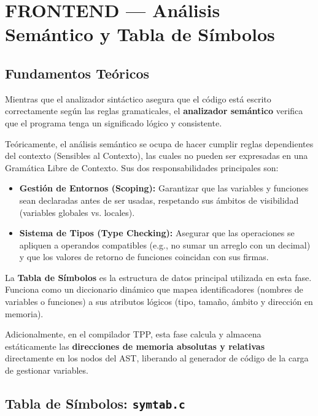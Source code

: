 \chapter{FRONTEND — Análisis Semántico y Tabla de Símbolos}

\section{Fundamentos Teóricos}

Mientras que el analizador sintáctico asegura que el código está escrito correctamente según las reglas gramaticales, el \textbf{analizador semántico} verifica que el programa tenga un significado lógico y consistente. 

Teóricamente, el análisis semántico se ocupa de hacer cumplir reglas dependientes del contexto (Sensibles al Contexto), las cuales no pueden ser expresadas en una Gramática Libre de Contexto. Sus dos responsabilidades principales son:
\begin{itemize}
    \item \textbf{Gestión de Entornos (Scoping):} Garantizar que las variables y funciones sean declaradas antes de ser usadas, respetando sus ámbitos de visibilidad (variables globales vs. locales).
    \item \textbf{Sistema de Tipos (Type Checking):} Asegurar que las operaciones se apliquen a operandos compatibles (e.g., no sumar un arreglo con un decimal) y que los valores de retorno de funciones coincidan con sus firmas.
\end{itemize}

\begin{infobox}
La \textbf{Tabla de Símbolos} es la estructura de datos principal utilizada en esta fase. Funciona como un diccionario dinámico que mapea identificadores (nombres de variables o funciones) a sus atributos lógicos (tipo, tamaño, ámbito y dirección en memoria).
\end{infobox}

Adicionalmente, en el compilador TPP, esta fase calcula y almacena estáticamente las \textbf{direcciones de memoria absolutas y relativas} directamente en los nodos del AST, liberando al generador de código de la carga de gestionar variables.

\section{Tabla de Símbolos: \texttt{symtab.c}}

